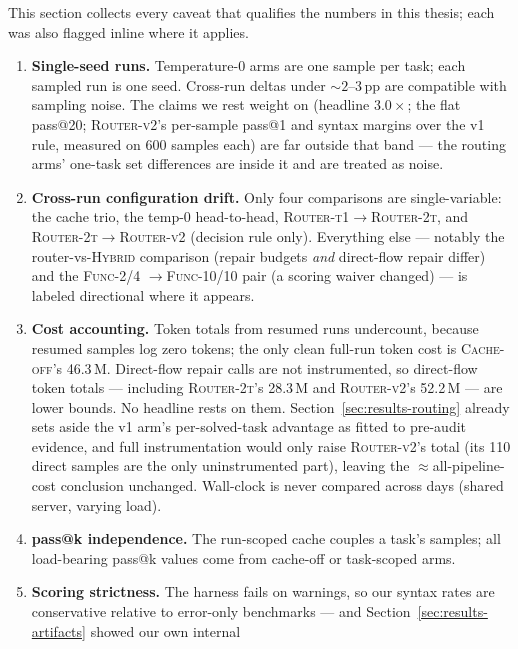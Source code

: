 This section collects every caveat that qualifies the numbers in
this thesis; each was also flagged inline where it applies.

\begin{enumerate}
  \item \textbf{Single-seed runs.} Temperature-0 arms are one sample per
    task; each sampled run is one seed. Cross-run deltas under
    ${\sim}2$--3\,pp are compatible with sampling noise. The claims we
    rest weight on (headline $3.0\times$; the flat pass@20;
    \textsc{Router-v2}'s per-sample pass@1 and syntax margins over the
    v1 rule, measured on 600 samples each) are far outside that band ---
    the routing arms' one-task set differences are inside it and are
    treated as noise.
  \item \textbf{Cross-run configuration drift.} Only four comparisons
    are single-variable: the cache trio, the temp-0 head-to-head,
    \textsc{Router-t1}$\to$\textsc{Router-2t}, and
    \textsc{Router-2t}$\to$\textsc{Router-v2} (decision rule only).
    Everything else ---
    notably the router-vs-\textsc{Hybrid} comparison (repair budgets
    \emph{and} direct-flow repair differ) and the \textsc{Func-2/4}
    $\to$\textsc{Func-10/10} pair (a scoring waiver changed) --- is
    labeled directional where it appears.
  \item \textbf{Cost accounting.} Token totals from resumed runs
    undercount, because resumed samples log zero tokens; the only clean
    full-run token cost is \textsc{Cache-off}'s 46.3\,M. Direct-flow
    repair calls are not instrumented, so direct-flow token totals ---
    including \textsc{Router-2t}'s 28.3\,M and \textsc{Router-v2}'s
    52.2\,M --- are lower bounds. No headline rests on them.
    Section~\ref{sec:results-routing} already sets aside the v1 arm's
    per-solved-task advantage as fitted to pre-audit evidence, and full
    instrumentation would only raise \textsc{Router-v2}'s total
    (its 110 direct samples are the only uninstrumented part), leaving
    the $\approx$all-pipeline-cost conclusion unchanged.
    Wall-clock is never compared across days (shared server, varying
    load).
  \item \textbf{pass@k independence.} The run-scoped cache couples a
    task's samples; all load-bearing pass@k values come from cache-off
    or task-scoped arms.
  \item \textbf{Scoring strictness.} The harness fails on warnings, so
    our syntax rates are conservative relative to error-only benchmarks
    --- and Section~\ref{sec:results-artifacts} showed our own internal

\end{enumerate}
